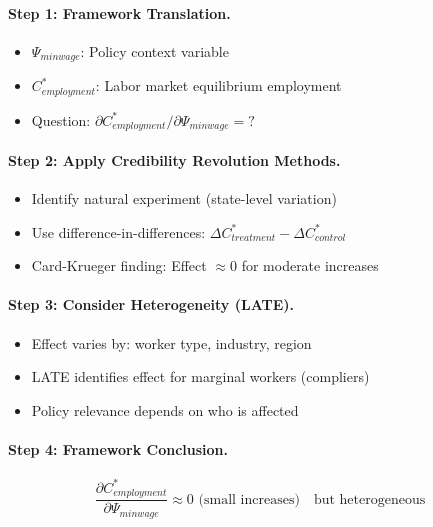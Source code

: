 \paragraph{Step 1: Framework Translation.}
\begin{itemize}
    \item $\Psi_{min wage}$: Policy context variable
    \item $C^*_{employment}$: Labor market equilibrium employment
    \item Question: $\partial C^*_{employment}/\partial \Psi_{min wage} = ?$
\end{itemize}

\paragraph{Step 2: Apply Credibility Revolution Methods.}
\begin{itemize}
    \item Identify natural experiment (state-level variation)
    \item Use difference-in-differences: $\Delta C^*_{treatment} - \Delta C^*_{control}$
    \item Card-Krueger finding: Effect $\approx 0$ for moderate increases
\end{itemize}

\paragraph{Step 3: Consider Heterogeneity (LATE).}
\begin{itemize}
    \item Effect varies by: worker type, industry, region
    \item LATE identifies effect for marginal workers (compliers)
    \item Policy relevance depends on who is affected
\end{itemize}

\paragraph{Step 4: Framework Conclusion.}
\begin{equation}
\frac{\partial C^*_{employment}}{\partial \Psi_{min wage}} \approx 0 \text{ (small increases)} \quad \text{but heterogeneous}
\end{equation}

